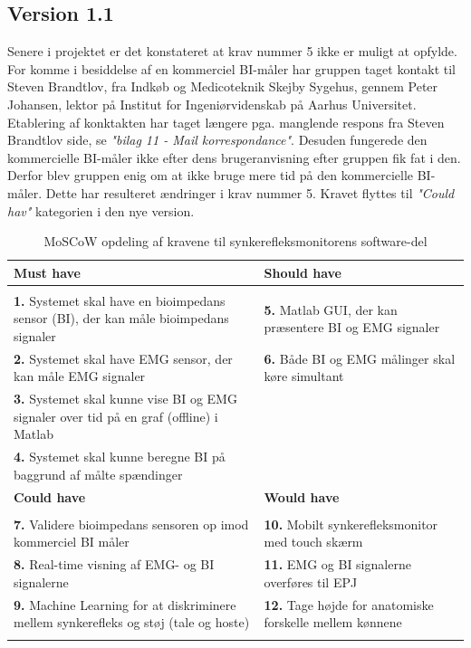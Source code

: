 \subsection{Version 1.1}

Senere i projektet er det konstateret at krav nummer 5 ikke er muligt at opfylde. For komme i besiddelse af en kommerciel BI-måler har gruppen taget kontakt til Steven Brandtlov, fra Indkøb og Medicoteknik Skejby Sygehus, gennem  Peter Johansen, lektor på Institut for Ingeniørvidenskab på Aarhus Universitet. Etablering af konktakten har taget længere pga. manglende respons fra Steven Brandtlov side, se \textit{"bilag 11 - Mail korrespondance"}. Desuden fungerede den kommercielle BI-måler ikke efter dens brugeranvisning efter gruppen fik fat i den. Derfor  blev gruppen enig om at ikke bruge mere tid på den kommercielle BI-måler. Dette har resulteret ændringer i krav nummer 5. Kravet flyttes til \textit{"Could hav"} kategorien i den nye version.  

\begin{table}[H]

\begin{tabularx}{\textwidth}{X|X}
\rowcolor{Gray}
\toprule
\textbf{Must have} & \textbf{Should have} \\
\hline \\
\textbf{1. }Systemet skal have en bioimpedans sensor (BI), der kan måle bioimpedans signaler & \textbf{5. }Matlab GUI, der kan præsentere BI og EMG signaler \\[4ex]
\textbf{2. }Systemet skal have EMG sensor, der kan måle EMG signaler & \textbf{6. }Både BI og EMG målinger skal køre simultant\\[4ex]
\textbf{3. }Systemet skal kunne vise BI og EMG signaler over tid på en graf (offline) i Matlab  & \\[4ex]
\textbf{4. }Systemet skal kunne beregne BI på baggrund af målte spændinger & \\[4ex]


\midrule
    \rowcolor{Gray}
    \textbf{Could have} & \textbf{Would have}\\
    \midrule \\
    \textbf{7. }Validere bioimpedans sensoren op imod kommerciel BI måler & \textbf{10. }Mobilt synkerefleksmonitor med touch skærm\\[4ex]
\textbf{8. }Real-time visning af EMG- og BI signalerne & \textbf{11. }EMG og BI signalerne overføres til EPJ  \\[4ex]
\textbf{9. }Machine Learning for at diskriminere mellem synkerefleks og støj (tale og hoste)& \textbf{12. }Tage højde for anatomiske forskelle mellem kønnene\\[4ex]
& \\

\end{tabularx}

\caption{MoSCoW opdeling af kravene til  synkerefleksmonitorens software-del}
  \label{tab:moscow}
\end{table}

